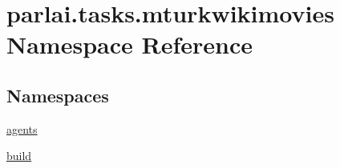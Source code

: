 \hypertarget{namespaceparlai_1_1tasks_1_1mturkwikimovies}{}\section{parlai.\+tasks.\+mturkwikimovies Namespace Reference}
\label{namespaceparlai_1_1tasks_1_1mturkwikimovies}
\subsection*{Namespaces}
\begin{DoxyCompactItemize}
\item 
 \hyperlink{namespaceparlai_1_1tasks_1_1mturkwikimovies_1_1agents}{agents}
\item 
 \hyperlink{namespaceparlai_1_1tasks_1_1mturkwikimovies_1_1build}{build}
\end{DoxyCompactItemize}
